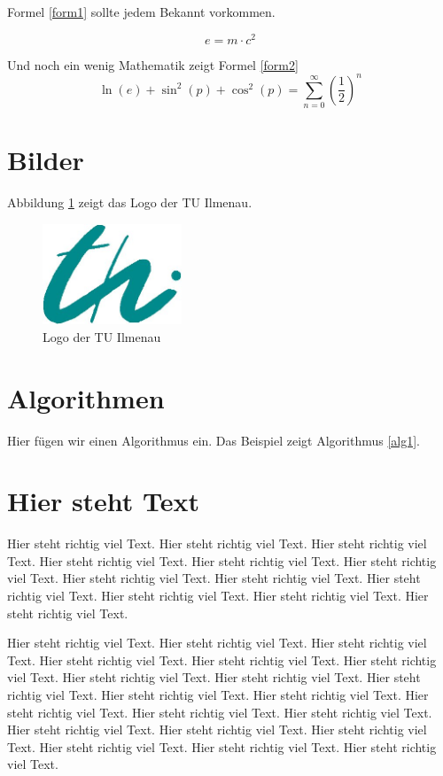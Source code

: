 Formel \ref{form1} sollte jedem Bekannt vorkommen.

\begin{equation}
e = m \cdot c^2
\label{form1}
\end{equation}

Und noch ein wenig Mathematik zeigt Formel \ref{form2}
\begin{equation}
\ln(e) + \sin^2(p) + \cos^2 (p) = \sum_{n=0}^{\infty} \left(\frac{1}{2}\right)^n
\label{form2}
\end{equation}


\section{Bilder}

Abbildung \ref{pic:logo} zeigt das Logo der TU Ilmenau.

\begin{figure}[t]
\begin{center}
	\includegraphics[height=3cm]{pics/logo-thi.jpg}
\end{center}
\caption{Logo der TU Ilmenau}
\label{pic:logo}
\end{figure}


\section{Algorithmen}

Hier fügen wir einen Algorithmus ein. Das Beispiel zeigt Algorithmus \ref{alg1}.


\section{Hier steht Text}

Hier steht richtig viel Text.
Hier steht richtig viel Text.
Hier steht richtig viel Text.
Hier steht richtig viel Text.
Hier steht richtig viel Text.
Hier steht richtig viel Text.
Hier steht richtig viel Text.
Hier steht richtig viel Text.
Hier steht richtig viel Text.
Hier steht richtig viel Text.
Hier steht richtig viel Text.
Hier steht richtig viel Text.

Hier steht richtig viel Text.
Hier steht richtig viel Text.
Hier steht richtig viel Text.
Hier steht richtig viel Text.
Hier steht richtig viel Text.
Hier steht richtig viel Text.
Hier steht richtig viel Text.
Hier steht richtig viel Text.
Hier steht richtig viel Text.
Hier steht richtig viel Text.
Hier steht richtig viel Text.
Hier steht richtig viel Text.
Hier steht richtig viel Text.
Hier steht richtig viel Text.
Hier steht richtig viel Text.
Hier steht richtig viel Text.
Hier steht richtig viel Text.
Hier steht richtig viel Text.
Hier steht richtig viel Text.
Hier steht richtig viel Text.


